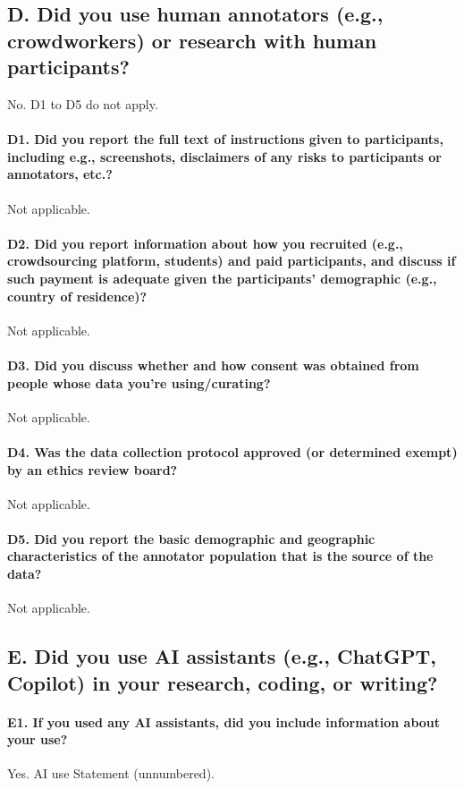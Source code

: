 \subsection*{D. Did you use human annotators (e.g., crowdworkers) or research with human participants?}
No. D1 to D5 do not apply.

\paragraph{D1. Did you report the full text of instructions given to participants, including e.g., screenshots, disclaimers of any risks to participants or annotators, etc.?}
Not applicable.

\paragraph{D2. Did you report information about how you recruited (e.g., crowdsourcing platform, students) and paid participants, and discuss if such payment is adequate given the participants' demographic (e.g., country of residence)?}
Not applicable.

\paragraph{D3. Did you discuss whether and how consent was obtained from people whose data you're using/curating?}
Not applicable.

\paragraph{D4. Was the data collection protocol approved (or determined exempt) by an ethics review board?}
Not applicable.

\paragraph{D5. Did you report the basic demographic and geographic characteristics of the annotator population that is the source of the data?}
Not applicable.

\subsection*{E. Did you use AI assistants (e.g., ChatGPT, Copilot) in your research, coding, or writing?}

\paragraph{E1. If you used any AI assistants, did you include information about your use?}
Yes. AI use Statement (unnumbered).
